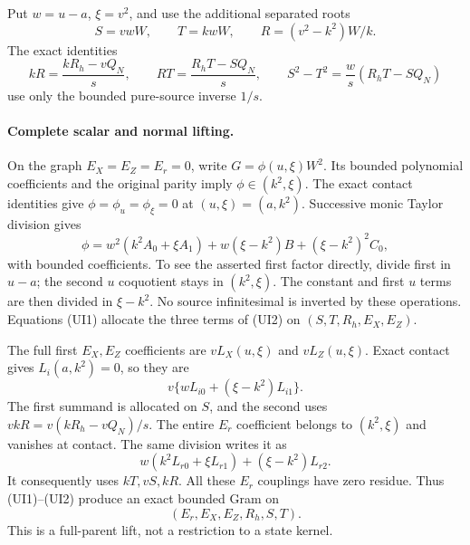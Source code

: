 Put $w=u-a$, $\xi=v^2$, and use the additional separated roots
\[
 S=vwW,\qquad T=kwW,\qquad R=(v^2-k^2)W/k.
\]
The exact identities
\[
 kR=\frac{kR_h-vQ_N}{s},\qquad
 RT=\frac{R_hT-SQ_N}{s},\qquad
 S^2-T^2=\frac w s(R_hT-SQ_N)                      \tag{UI1}
\]
use only the bounded pure-source inverse $1/s$.

\paragraph{Complete scalar and normal lifting.}
On the graph $E_X=E_Z=E_r=0$, write $G=\phi(u,\xi)W^2$.
Its bounded polynomial coefficients and the original parity imply
$\phi\in(k^2,\xi)$. The exact contact identities give
$\phi=\phi_u=\phi_\xi=0$ at $(u,\xi)=(a,k^2)$.
Successive monic Taylor division gives
\[
 \phi=w^2(k^2A_0+\xi A_1)
             +w(\xi-k^2)B+(\xi-k^2)^2C_0,          \tag{UI2}
\]
with bounded coefficients. To see the asserted first factor directly,
divide first in $u-a$; the second $u$ coquotient stays in
$(k^2,\xi)$. The constant and first $u$ terms are then divided in
$\xi-k^2$. No source infinitesimal is inverted by these operations.
Equations (UI1) allocate the three terms of (UI2) on
$(S,T,R_h,E_X,E_Z)$.

The full first $E_X,E_Z$ coefficients are $vL_X(u,\xi)$ and
$vL_Z(u,\xi)$. Exact contact gives $L_i(a,k^2)=0$, so they are
\[
 v\{wL_{i0}+(\xi-k^2)L_{i1}\}.
\]
The first summand is allocated on $S$, and the second uses
$vkR=v(kR_h-vQ_N)/s$. The entire $E_r$ coefficient belongs to
$(k^2,\xi)$ and vanishes at contact. The same division writes it as
\[
 w(k^2L_{r0}+\xi L_{r1})+(\xi-k^2)L_{r2}.
\]
It consequently uses $kT,vS,kR$. All these $E_r$ couplings have
zero residue. Thus (UI1)--(UI2) produce an exact bounded Gram on
\[
             (E_r,E_X,E_Z,R_h,S,T).                 \tag{UI3}
\]
This is a full-parent lift, not a restriction to a state kernel.

